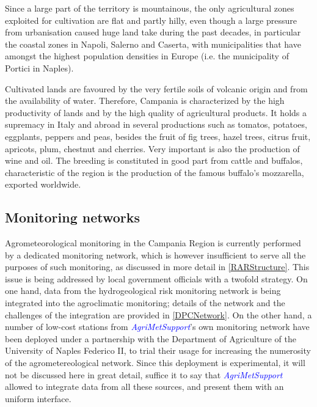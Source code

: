\documentclass[authoryear,preprint,review,12pt]{elsarticle}
\newcommand{\update}[1]{\emph{\textcolor{blue}{#1}}}
\newcommand{\gci}{\update{AgriMetSupport}\xspace}
\begin{document}
Since a large part of the territory is mountainous, the only agricultural zones exploited for cultivation are flat and partly hilly, even though a large pressure from urbanisation caused huge land take during the past decades, in particular  the coastal zones in Napoli, Salerno and Caserta, with municipalities that have amongst the highest population densities in Europe (i.e. the municipality of Portici in Naples).

Cultivated lands are favoured by the very fertile soils of volcanic origin and from the availability of water. 
Therefore, Campania is characterized by the high productivity of lands and by the high quality of agricultural products.
It holds a supremacy in Italy and abroad in several productions such as tomatos, potatoes, eggplants, peppers and peas, besides the fruit of fig trees, hazel trees, citrus fruit, apricots, plum, chestnut and cherries.
Very important is also the production of wine and oil.
The breeding is constituted in good part from cattle and buffalos, characteristic of the region is the production of the famous buffalo's mozzarella, exported worldwide.


\subsection{Monitoring networks}

Agrometeorological monitoring in the Campania Region is currently performed by a dedicated monitoring network, which is however insufficient to serve all the purposes of such monitoring, as discussed in more detail in \cref{RARStructure}.
This issue is being addressed by local government officials with a twofold strategy.
On one hand, data from the hydrogeological risk monitoring network is being integrated into the agroclimatic monitoring; details of the network and the challenges of the integration are provided in \cref{DPCNetwork}.
On the other hand, a number of low-cost stations from \gci's own monitoring network have been deployed under a partnership with the Department of Agriculture of the University of Naples Federico II, to trial their usage for increasing the numerosity of the agrometereological network.
Since this deployment is experimental, it will not be discussed here in great detail, suffice it to say that \gci allowed to integrate data from all these sources, and present them with an uniform interface.
\end{document}
